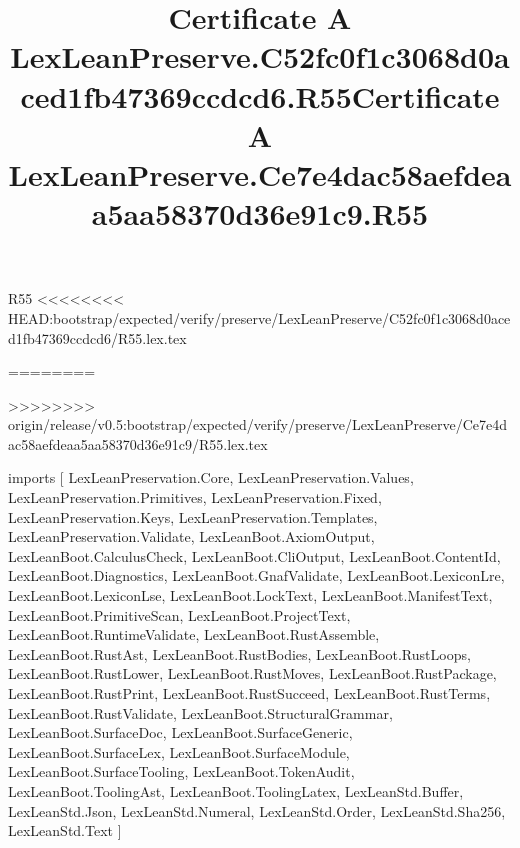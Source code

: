 \begin{lexlean}{R55}
<<<<<<<< HEAD:bootstrap/expected/verify/preserve/LexLeanPreserve/C52fc0f1c3068d0aced1fb47369ccdcd6/R55.lex.tex
\title{Certificate A LexLeanPreserve.C52fc0f1c3068d0aced1fb47369ccdcd6.R55}
========
\title{Certificate A LexLeanPreserve.Ce7e4dac58aefdeaa5aa58370d36e91c9.R55}
>>>>>>>> origin/release/v0.5:bootstrap/expected/verify/preserve/LexLeanPreserve/Ce7e4dac58aefdeaa5aa58370d36e91c9/R55.lex.tex
\begin{coremodule}
imports [
  LexLeanPreservation.Core,
  LexLeanPreservation.Values,
  LexLeanPreservation.Primitives,
  LexLeanPreservation.Fixed,
  LexLeanPreservation.Keys,
  LexLeanPreservation.Templates,
  LexLeanPreservation.Validate,
  LexLeanBoot.AxiomOutput,
  LexLeanBoot.CalculusCheck,
  LexLeanBoot.CliOutput,
  LexLeanBoot.ContentId,
  LexLeanBoot.Diagnostics,
  LexLeanBoot.GnafValidate,
  LexLeanBoot.LexiconLre,
  LexLeanBoot.LexiconLse,
  LexLeanBoot.LockText,
  LexLeanBoot.ManifestText,
  LexLeanBoot.PrimitiveScan,
  LexLeanBoot.ProjectText,
  LexLeanBoot.RuntimeValidate,
  LexLeanBoot.RustAssemble,
  LexLeanBoot.RustAst,
  LexLeanBoot.RustBodies,
  LexLeanBoot.RustLoops,
  LexLeanBoot.RustLower,
  LexLeanBoot.RustMoves,
  LexLeanBoot.RustPackage,
  LexLeanBoot.RustPrint,
  LexLeanBoot.RustSucceed,
  LexLeanBoot.RustTerms,
  LexLeanBoot.RustValidate,
  LexLeanBoot.StructuralGrammar,
  LexLeanBoot.SurfaceDoc,
  LexLeanBoot.SurfaceGeneric,
  LexLeanBoot.SurfaceLex,
  LexLeanBoot.SurfaceModule,
  LexLeanBoot.SurfaceTooling,
  LexLeanBoot.TokenAudit,
  LexLeanBoot.ToolingAst,
  LexLeanBoot.ToolingLatex,
  LexLeanStd.Buffer,
  LexLeanStd.Json,
  LexLeanStd.Numeral,
  LexLeanStd.Order,
  LexLeanStd.Sha256,
  LexLeanStd.Text
]


\end{coremodule}
\end{lexlean}
